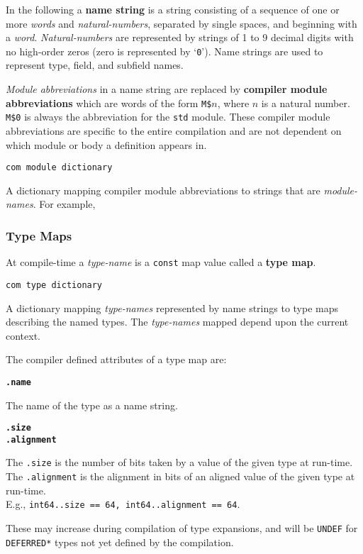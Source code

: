 \documentclass[12pt]{article}
\newcommand{\key}[1]{{\rm \bfseries #1}}
\newcommand{\ttkey}[1]{{\tt \bfseries #1}}
\newenvironment{indpar}[1][0.3in]%
	{\begin{list}{}%
		     {\setlength{\itemsep}{0in}%
		      \setlength{\topsep}{0in}%
		      \setlength{\parsep}{1ex}%
		      \setlength{\labelwidth}{#1}%
		      \setlength{\leftmargin}{#1}%
		      \addtolength{\leftmargin}{\labelsep}}%
	 \item}%
	{\end{list}}
\begin{document}
In the following a \key{name string} is a string
consisting of a sequence of one or more {\em words}
and {\em natural-numbers}, separated
by single spaces, and beginning with a {\em word}.
{\em Natural-numbers} are represented
by strings of 1 to 9 decimal digits with no high-order
zeros (zero is represented by `{\tt 0}').
Name strings are used to represent type, field, and subfield
names.

{\em Module abbreviations} in a name string are
replaced by \key{compiler module abbreviations}
which are words of the form {\tt M\$$n$}, where
$n$ is a natural number.  {\tt M\$0} is always
the abbreviation for the {\tt std} module.
These compiler module abbreviations are specific to the
entire compilation and are not dependent on which
module or body a definition appears in.

{\tt com module dictionary}
\begin{indpar}
A dictionary mapping compiler module abbreviations
to strings that are {\em module-names}.  For example,
\\
\hspace*{1.5in}{\tt com module dictionary["M\$0"] == "standard"}
\end{indpar}

\subsubsection{Type Maps}
\label{TYPE-MAPS}

At compile-time a {\em type-name} is a {\tt const} map value
called a \key{type map}.

{\tt com type dictionary}
\begin{indpar}
A dictionary mapping {\em type-names}
represented by name strings to type maps describing the
named types.  The {\em type-names} mapped depend upon
the current context.
\end{indpar}

The compiler defined attributes of a type map are:

\ttkey{.name}
\begin{indpar}
The name of the type as a name string.
\end{indpar}

\ttkey{.size} \\
\ttkey{.alignment}
\begin{indpar}
The {\tt .size} is the number of bits taken by a value of the given type at
run-time.
The {\tt .alignment} is the alignment in bits
of an aligned value of the given type at
run-time.
\\ E.g., {\tt int64..size == 64, int64..alignment == 64}.

These may increase during compilation of type expansions, and will be
{\tt UNDEF} for {\tt *DEFERRED*} types not yet defined by the
compilation.
\end{indpar}
\end{document}
